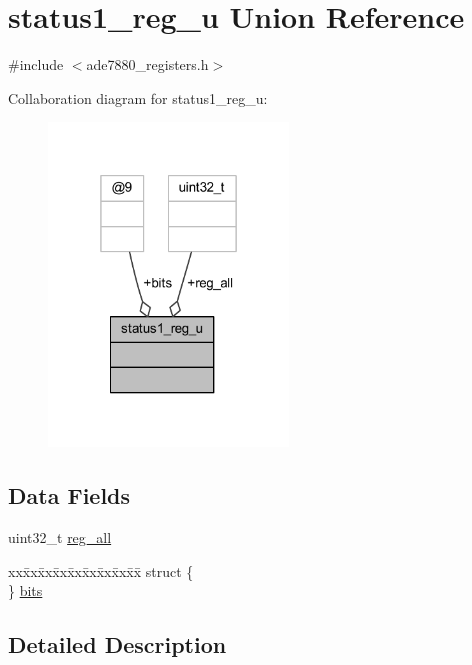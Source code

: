 \hypertarget{a00033}{\section{status1\-\_\-reg\-\_\-u Union Reference}
\label{d0/dc0/a00033}
}


{\ttfamily \#include $<$ade7880\-\_\-registers.\-h$>$}



Collaboration diagram for status1\-\_\-reg\-\_\-u\-:\nopagebreak
\begin{figure}[H]
\begin{center}
\leavevmode
\includegraphics[width=181pt]{d0/d61/a00100}
\end{center}
\end{figure}
\subsection*{Data Fields}
\begin{DoxyCompactItemize}
\item 
uint32\-\_\-t \hyperlink{a00033_ae44a0232a79ff51b5ef7aa80e4b35470}{reg\-\_\-all}
\item 
\begin{tabbing}
xx\=xx\=xx\=xx\=xx\=xx\=xx\=xx\=xx\=\kill
struct \{\\
\} \hyperlink{a00033_acc8266b43bfb109c59e6515ee4d6a716}{bits}\\

\end{tabbing}\end{DoxyCompactItemize}


\subsection{Detailed Description}


